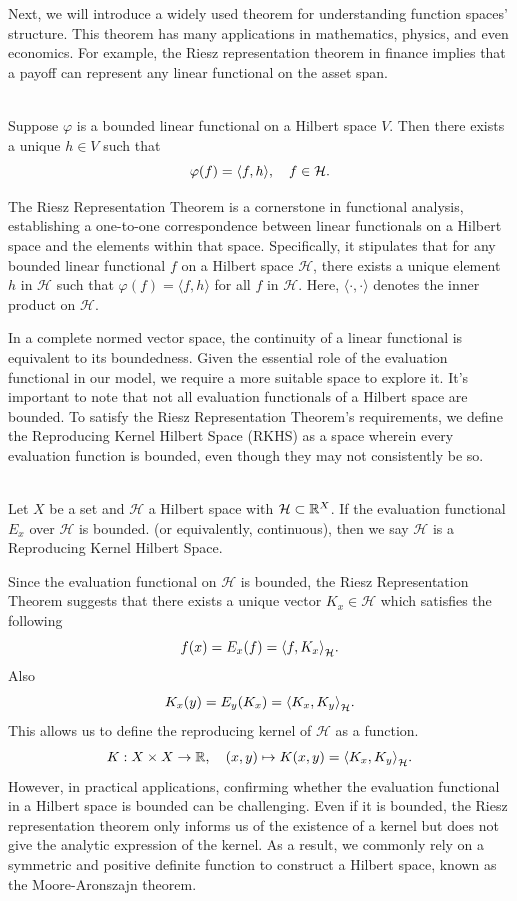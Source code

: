 Next, we will introduce a widely used theorem for understanding function spaces' structure. This theorem has many applications in mathematics, physics, and even economics. For example, the Riesz representation theorem in finance implies that a payoff can represent any linear functional on the asset span.

\begin{Theorem} \ \\ 
Suppose $\varphi$ is a bounded linear functional on a Hilbert space $V$. Then there exists a unique $h \in V$ such that
$$
\varphi(f) = {\langle f,h\rangle}, \quad f \in \mathcal{H}.
$$
\end{Theorem}
The Riesz Representation Theorem is a cornerstone in functional analysis, establishing a one-to-one correspondence between linear functionals on a Hilbert space and the elements within that space. Specifically, it stipulates that for any bounded linear functional $f$ on a Hilbert space $\mathcal{H}$, there exists a unique element $h$ in $\mathcal{H}$ such that $\varphi(f) = \langle f, h\rangle$ for all $f$ in $\mathcal{H}$. Here, $\langle\cdot,\cdot\rangle$ denotes the inner product on $\mathcal{H}$.

In a complete normed vector space, the continuity of a linear functional is equivalent to its boundedness. Given the essential role of the evaluation functional in our model, we require a more suitable space to explore it. It's important to note that not all evaluation functionals of a Hilbert space are bounded. To satisfy the Riesz Representation Theorem's requirements, we define the Reproducing Kernel Hilbert Space (RKHS) as a space wherein every evaluation function is bounded, even though they may not consistently be so.

\begin{Definition}[RKHS] \ \\
	Let $X$ be a set and $\mathcal{H}$ a Hilbert space with $\mathcal{H} \subset \mathbb{R}^{X}$. If the evaluation functional $E_x$ over $\mathcal{H}$ is bounded. (or equivalently, continuous), then we say $\mathcal{H}$ is a Reproducing Kernel Hilbert Space.
\end{Definition}

Since the evaluation functional on $\mathcal{H}$ is bounded, the Riesz Representation Theorem suggests that there exists a unique vector $K_x \in \mathcal{H}$ which satisfies the following  
$$
f(x) = E_x(f) = {\langle f,K_x\rangle}_{\mathcal{H}}.
$$
Also 
$$
K_x(y) = E_y(K_x) = {\langle K_x,K_y\rangle}_{\mathcal{H}}.
$$
This allows us to define the reproducing kernel of $\mathcal{H}$ as a function. 
$$
K: X \times X \to \mathbb{R}, \quad (x,y) \mapsto K(x,y) = {\langle K_x,K_y\rangle}_{\mathcal{H}}.
$$
\C{}
However, in practical applications, confirming whether the evaluation functional in a Hilbert space is bounded can be challenging. Even if it is bounded, the Riesz representation theorem only informs us of the existence of a kernel but does not give the analytic expression of the kernel. As a result, we commonly rely on a symmetric and positive definite function to construct a Hilbert space, known as the Moore-Aronszajn theorem.

